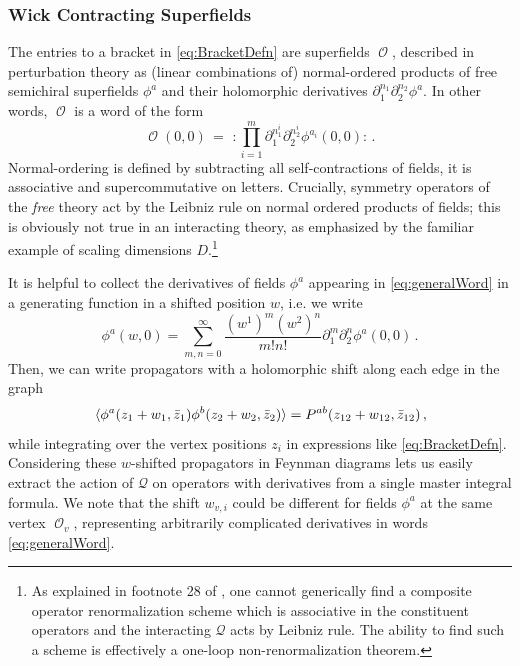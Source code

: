\documentclass[11pt]{article}
\DeclareMathOperator{\calO}{\mathcal{O}}
\renewcommand{\bm}{\mathcal}
\begin{document}
\subsubsection*{Wick Contracting Superfields} 
The entries to a bracket in \eqref{eq:BracketDefn} are superfields $\calO$, described in perturbation theory as (linear combinations of) normal-ordered products of free semichiral superfields $\phi^a$ and their holomorphic derivatives $\partial_{1}^{n_{1}} \partial_{2}^{n_{2}} \phi^a$. In other words, $\calO$ is a word of the form
\begin{equation}\label{eq:generalWord}
    \calO(0,0) \, =\,\, :\!\prod_{i=1}^{m} \partial_{1}^{n^{i}_{1}} \partial_{2}^{n^{i}_{2}} \phi^{a_i}(0,0)\!:\,.
\end{equation}
Normal-ordering is defined by subtracting all self-contractions of fields, it is associative and supercommutative on letters. Crucially, symmetry operators of the \textit{free} theory act by the Leibniz rule on normal ordered products of fields; this is obviously not true in an interacting theory, as emphasized by the familiar example of scaling dimensions $D$.\footnote{As explained in footnote 28 of \cite{Budzik:2023xbr}, one cannot generically find a composite operator renormalization scheme which is associative in the constituent operators and the interacting $\bm{Q}$ acts by Leibniz rule. The ability to find such a scheme is effectively a one-loop non-renormalization theorem.}

It is helpful to collect the derivatives of fields $\phi^a$ appearing in \eqref{eq:generalWord} in a generating function in a shifted position $w$, i.e. we write
\begin{equation}
    \phi^a(w,0) = \sum_{m,n=0}^\infty \frac{(w^1)^{m}(w^2)^{n}}{m! n!} \partial_{1}^{m} \partial_{2}^{n} \phi^{a}(0,0)\,. \label{eq:gen}
\end{equation}
Then, we can write propagators with a holomorphic shift along each edge in the graph
\begin{equation}\label{eq:shiftedPropagator}
    \expval*{\phi^a(z_1+w_1,\bar{z}_1) \phi^b(z_2+w_2,\bar{z}_2)} = P^{ab}(z_{12}+w_{12},\bar{z}_{12})\,,
\end{equation}
while integrating over the vertex positions $z_i$ in expressions like \eqref{eq:BracketDefn}. Considering these $w$-shifted propagators in Feynman diagrams lets us easily extract the action of $\bm{Q}$ on operators with derivatives from a single master integral formula. We note that the shift $w_{v,i}$ could be different for fields $\phi^a$ at the same vertex $\calO_v$, representing arbitrarily complicated derivatives in words \eqref{eq:generalWord}.
\end{document}
